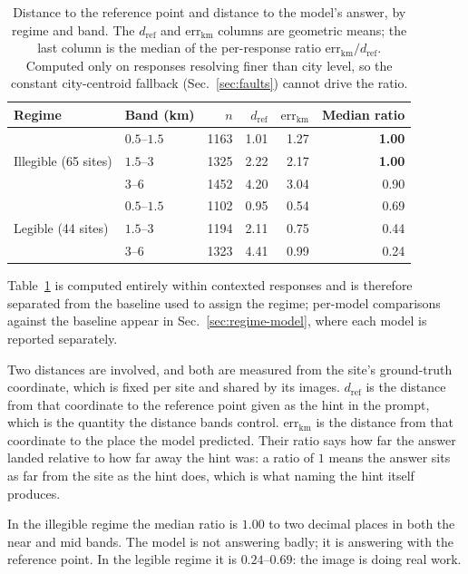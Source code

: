 \documentclass[10pt,a4paper]{article}
\newcommand{\errkm}{\ensuremath{\mathrm{err}_{\mathrm{km}}}}
\newcommand{\refkm}{\ensuremath{d_{\mathrm{ref}}}}
\begin{document}
\begin{table}[!htbp]
\centering
\caption{Distance to the reference point and distance to the model's answer, by
regime and band. The $\refkm$ and $\errkm$ columns are geometric means; the last
column is the median of the per-response ratio $\errkm/\refkm$. Computed only on
responses resolving finer than city level, so the constant city-centroid
fallback (Sec.~\ref{sec:faults}) cannot drive the ratio.}
\label{tab:ratio}
\begin{tabular}{llrrrr}
\toprule
Regime & Band (\si{\kilo\metre}) & $n$ & $\refkm$ & $\errkm$ & Median ratio \\
\midrule
\multirow{3}{*}{Illegible (65 sites)}
 & $0.5$--$1.5$ & 1163 & 1.01 & 1.27 & \textbf{1.00} \\
 & $1.5$--$3$   & 1325 & 2.22 & 2.17 & \textbf{1.00} \\
 & $3$--$6$     & 1452 & 4.20 & 3.04 & 0.90 \\
\midrule
\multirow{3}{*}{Legible (44 sites)}
 & $0.5$--$1.5$ & 1102 & 0.95 & 0.54 & 0.69 \\
 & $1.5$--$3$   & 1194 & 2.11 & 0.75 & 0.44 \\
 & $3$--$6$     & 1323 & 4.41 & 0.99 & 0.24 \\
\bottomrule
\end{tabular}
\end{table}

Table~\ref{tab:ratio} is computed entirely within contexted responses and is
therefore separated from the baseline used to assign the regime; per-model
comparisons against the baseline appear in Sec.~\ref{sec:regime-model}, where
each model is reported separately.

Two distances are involved, and both are measured from the site's ground-truth
coordinate, which is fixed per site and shared by its images. $\refkm$ is the
distance from that coordinate to the reference point given as the hint in the
prompt, which is the quantity the distance bands control. $\errkm$ is the
distance from that coordinate to the place the model predicted. Their ratio says how far the answer landed relative to how far away
the hint was: a ratio of $1$ means the answer sits as far from the site as the
hint does, which is what naming the hint itself produces.

In the illegible regime the median ratio is $1.00$ to two decimal places in both
the near and mid bands. The model is not answering badly; it is answering with
the reference point. In the legible regime it is $0.24$--$0.69$: the image is
doing real work.
\end{document}
